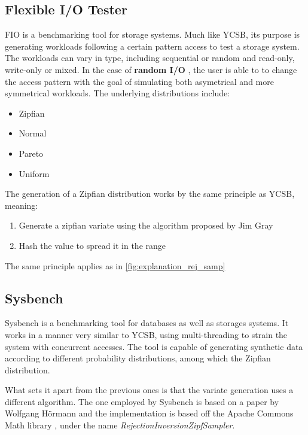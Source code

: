 \subsection{Flexible I/O Tester}
\ac{FIO} \cite{1FioFlexible} is a benchmarking tool for storage systems. Much like YCSB, its purpose is generating workloads following a certain pattern access
to test a storage system. The workloads can vary in type, including sequential or random and read-only, write-only or mixed. In the case of \textbf{random I/O} , the user is able to 
to change the access pattern with the goal of simulating both asymetrical and more symmetrical workloads. The underlying distributions include:
\begin{itemize}
  \item Zipfian 
  \item Normal
  \item Pareto
  \item Uniform
\end{itemize}

The generation of a Zipfian distribution works by the same principle as YCSB, meaning:
\begin{enumerate}
  \item Generate a zipfian variate using the algorithm proposed by Jim Gray \cite{grayQuicklyGeneratingBillionrecord1994}
  \item Hash the value to spread it in the range
\end{enumerate}

The same principle applies as in \ref{fig:explanation_rej_samp}

\subsection{Sysbench}
Sysbench \cite{kopytovAkopytovSysbench2025} is a benchmarking tool for databases as well as storages systems. It works in a manner
very similar to YCSB, using multi-threading to strain the system with concurrent accesses. The tool is capable of generating synthetic data
according to different probability distributions, among which the Zipfian distribution.

What sets it apart from the previous ones is that the variate generation uses a different algorithm. The one employed by Sysbench is based on a paper
by Wolfgang Hörmann \cite{hormannRejectioninversionGenerateVariates1996} and the implementation is based off the Apache Commons Math library \cite{MathCommonsMath}, under the 
name \textit{RejectionInversionZipfSampler}.

